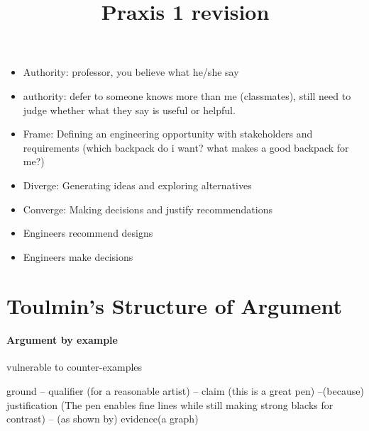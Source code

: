 \documentclass[12pt]{article}
\title{ Praxis 1 revision}
\begin{document}
\maketitle

\begin{itemize}

\item Authority: professor, you believe what he/she say
\item authority: defer to someone knows more than me (classmates), still need to judge whether what they say is useful or helpful.
\item Frame: Defining an engineering opportunity with stakeholders and requirements (which backpack do i want? what makes a good backpack for me?)
\item Diverge: Generating ideas and exploring alternatives
\item Converge: Making decisions and justify recommendations
\item Engineers recommend designs
\item Engineers make decisions

\end{itemize}

\section{Toulmin's Structure of Argument}

\paragraph{Argument by example}

vulnerable to counter-examples

ground -- qualifier (for a reasonable artist) -- claim (this is a great pen) --(because) justification (The pen enables fine lines while still making strong blacks for contrast) -- (as shown by) evidence(a graph)
\end{document}
